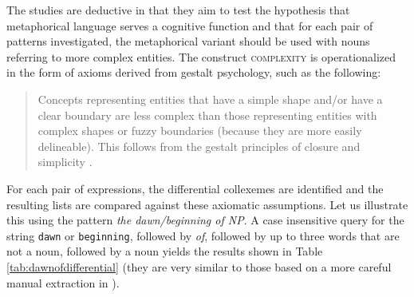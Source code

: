 The studies are deductive in that they aim to test the hypothesis that metaphorical language serves a cognitive function and that for each pair of patterns investigated, the metaphorical variant should be used with nouns referring to more complex entities. The construct \textsc{complexity} is operationalized in the form of axioms derived from gestalt psychology, such as the following:

\begin{quote}
Concepts representing entities that have a simple shape and/or have a clear boundary are less complex than those representing entities with complex shapes or fuzzy boundaries (because they are more easily delineable). This follows from the gestalt principles of closure and simplicity \citep[170]{stefanowitsch_function_2005}.
\end{quote}

For each pair of expressions, the differential collexemes are identified and the resulting lists are compared against these axiomatic assumptions. Let us illustrate this using the pattern \textit{the dawn/beginning of NP}. A case insensitive query for the string \texttt{dawn} or \texttt{beginning}, followed by \textit{of}, followed by up to three words that are not a noun, followed by a noun yields the results shown in Table \ref{tab:dawnofdifferential} (they are very similar to those based on a more careful manual extraction in \citet{stefanowitsch_function_2005}).

